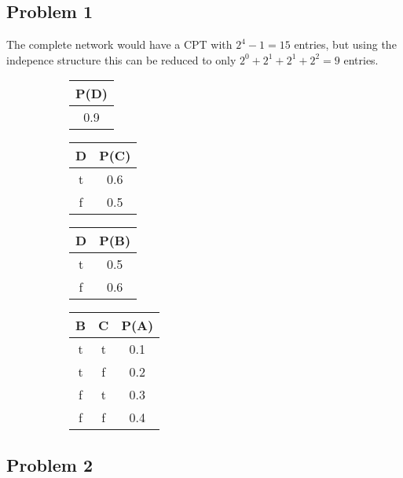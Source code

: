 \documentclass[12pt, letterpaper]{article}
\begin{document}
\subsection{Problem 1}

The complete network would have a CPT with $2^4-1 = 15$ entries, but using
the indepence structure this can be reduced to only $2^0+2^1+2^1+2^2 = 9$ entries.

\begin{figure}[H]
  \begin{subfigure}[t]{0.14\textwidth}
    \begin{tabular}[t]{|c|}
      \hline
      P(D) \\
      \hline
      0.9 \\
      \hline
    \end{tabular}
  \end{subfigure}
  \begin{subfigure}[t]{0.2\textwidth}
    \begin{tabular}[t]{|c|c|}
      \hline
      D & P(C) \\
      \hline
      t & 0.6 \\
      f & 0.5 \\
      \hline
    \end{tabular}
  \end{subfigure}
  \begin{subfigure}[t]{0.2\textwidth}
    \begin{tabular}[t]{|c|c|}
      \hline
      D & P(B) \\
      \hline
      t & 0.5 \\
      f & 0.6 \\
      \hline
    \end{tabular}
  \end{subfigure}
  \begin{subfigure}[t]{0.4\textwidth}
    \begin{tabular}[t]{|c|c|c|}
      \hline
      B & C & P(A) \\
      \hline
      t & t & 0.1 \\
      t & f & 0.2 \\
      f & t & 0.3 \\
      f & f & 0.4 \\
      \hline
    \end{tabular}
  \end{subfigure}

\end{figure}

\subsection{Problem 2}
\end{document}
